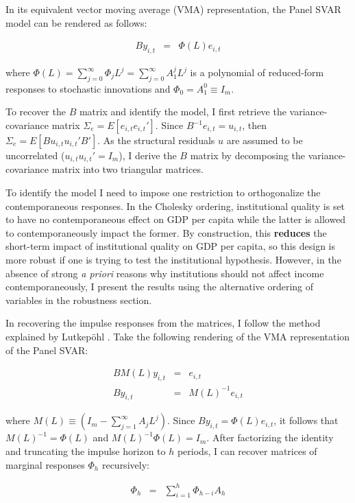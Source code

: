 \documentclass{article}
\begin{document}
In its equivalent vector moving average (VMA) representation, the Panel SVAR model can be rendered as follows:

\begin{eqnarray}
    By_{i,t} &=& \Phi (L) e_{i,{t}} 
\end{eqnarray}

where $\Phi(L) = \sum_{j=0}^{\infty} \Phi_{j} L^j = \sum_{j=0}^{\infty} A_{1}^j L^j$ is a polynomial of reduced-form responses to stochastic innovations and $\Phi_0 = A_1^0 \equiv I_m$.

To recover the $B$ matrix and identify the model, I first retrieve the variance-covariance matrix $\Sigma_e = E[e_{i,t}e_{i,t}']$. Since  $B^{-1}e_{i,t} = u_{i,t}$, then $\Sigma_e = E[Bu_{i,t}u_{i,t}'{B}']$. As the structural residuals $u$ are assumed to be uncorrelated ($u_{i,t}u_{i,t}' = I_m$), I derive the $B$ matrix by decomposing the variance-covariance matrix into two triangular matrices.

To identify the model I need to impose one restriction to orthogonalize the contemporaneous responses. In the Cholesky ordering, institutional quality is set to have no contemporaneous effect on GDP per capita while the latter is allowed to contemporaneously impact the former. By construction, this \textbf{reduces} the short-term impact of institutional quality on GDP per capita, so this design is more robust if one is trying to test the institutional hypothesis. However, in the absence of strong \textit{a priori} reasons why institutions should not affect income contemporaneously, I present the results using the alternative ordering of variables in the robustness section.

In recovering the impulse responses from the matrices, I follow the method explained by Lutkepöhl \parencite*{lutkepohl}. Take the following rendering of the VMA representation of the Panel SVAR:  

\begin{eqnarray}
    B M(L) y_{i,t} &=& e_{i,t} \\
    B y_{i,t} &=& M(L)^{-1} e_{i,t} \nonumber 
\end{eqnarray}

where $M(L) \equiv (I_m - \sum_{j=1}^\infty A_{j} L^j)$. Since $B y_{i,t} = \Phi(L) e_{i,{t}}$, it follows that $M(L)^{-1} = \Phi(L)$ and $M(L)^{-1}\Phi(L) = I_m$. After factorizing the identity and truncating the impulse horizon to $h$ periods, I can recover matrices of marginal responses $\Phi_h$ recursively:

\begin{eqnarray}
    \Phi_h &=&  \sum_{i=1}^h \Phi_{h-i}A_h
\end{eqnarray}
\end{document}
